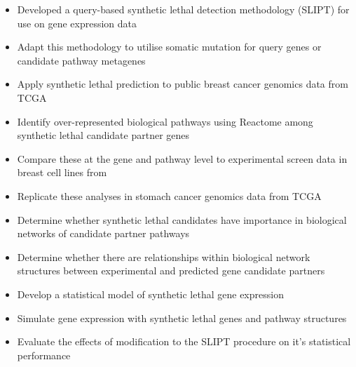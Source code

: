 \begin{itemize}

\item 

Developed a query-based \gls{synthetic lethal} detection methodology (\gls{SLIPT}) for use on gene expression data

\item 

Adapt this methodology to utilise somatic mutation for query genes or candidate pathway metagenes

\item 

Apply \Gls{synthetic lethal} prediction to public breast cancer \gls{genomics} data from \gls{TCGA} \citep{TCGA2012}

\item 

Identify over-represented biological pathways using Reactome \citep{Reactome} among \gls{synthetic lethal} candidate partner genes

\item

Compare these at the gene and pathway level to experimental screen data in breast cell lines from \citet{Telford2015}

\item

Replicate these analyses in stomach cancer \gls{genomics} data from \gls{TCGA} \citep{TCGA2014GC}

\item

Determine whether \gls{synthetic lethal} candidates have importance in biological networks of candidate partner pathways 

\item

Determine whether there are relationships within biological network structures between experimental and predicted gene candidate partners 

\item

Develop a statistical model of \gls{synthetic lethal} gene expression

\item

Simulate gene expression with \gls{synthetic lethal} genes and pathway structures

\item

Evaluate the effects of modification to the \gls{SLIPT} procedure on it's statistical performance


\end{itemize}
